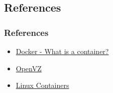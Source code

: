 \documentclass[t,28pt,aspectratio=169,usenames,dvipsnames]{beamer}
\begin{document}
\subsection{References}
\begin{frame}
    \frametitle{References}
    \begin{itemize}
        \item \href{https://www.docker.com/resources/what-container}{Docker - What is a container?}
        \item \href{https://openvz.org/}{OpenVZ}
        \item \href{https://linuxcontainers.org/}{Linux Containers}
    \end{itemize}
\end{frame}
\end{document}
